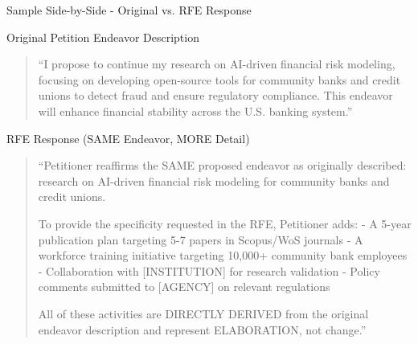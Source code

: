 \documentclass[11pt]{beamer}
\begin{document}
	\begin{frame}{Sample Side-by-Side - Original vs. RFE Response}
		\scriptsize
		\begin{block}{Original Petition Endeavor Description}
			\begin{quote}
				``I propose to continue my research on AI-driven financial risk modeling, focusing on developing open-source tools for community banks and credit unions to detect fraud and ensure regulatory compliance. This endeavor will enhance financial stability across the U.S. banking system.''
			\end{quote}
		\end{block}
		\begin{block}{RFE Response (SAME Endeavor, MORE Detail)}
			\begin{quote}
				``Petitioner reaffirms the SAME proposed endeavor as originally described: research on AI-driven financial risk modeling for community banks and credit unions.
				
				To provide the specificity requested in the RFE, Petitioner adds:
				- A 5-year publication plan targeting 5-7 papers in Scopus/WoS journals
				- A workforce training initiative targeting 10,000+ community bank employees
				- Collaboration with [INSTITUTION] for research validation
				- Policy comments submitted to [AGENCY] on relevant regulations
				
				All of these activities are DIRECTLY DERIVED from the original endeavor description and represent ELABORATION, not change.''
			\end{quote}
		\end{block}
	\end{frame}
	
\end{document}
